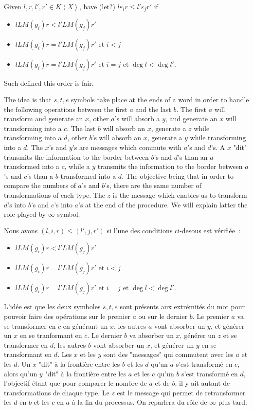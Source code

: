 \documentclass[sigconf]{acmart}
\theoremstyle{plain}
\theoremstyle{definition}
\theoremstyle{remark}
\newcommand{\LM}{LM}
\newcommand\fixmecc[1]{{\color{red}{\underline{\bf C:}} #1}}
\newcommand{\KX}{K \left\langle X \right\rangle}
\begin{document}
\fixmecc{Given $l,r,l',r'\in\KX$, have (let?) $l\varepsilon_i r\leq l'\varepsilon_j r'$ if
  \begin{itemize}
  \item $l\LM(g_i)r < l'\LM(g_j)r'$
  \item $l\LM(g_i)r = l'\LM(g_j)r'$ et $i < j$
  \item $l\LM(g_i)r = l'\LM(g_j)r'$ et $i = j$ et $\deg{l} < \deg{l'}$.
  \end{itemize}
  Such defined this order is fair.
      
  The idea is that $s, t, e$ symbols take place at the ends of a word in order to handle the following operations between the first $a$ and the last $b$.
  The first $a$ will transform and generate an $x$, other $a$'s will absorb a $y$, and generate an $x$ will transforming into a $c$.
The last $b$ will absorb an $x$, generate a $z$ while transforming into a $d$, other $b$'s will absorb an $x$, generate a $y$ while transforming into a $d$.
The $x$'s and $y$'s are messages which commute with $a$'s and $d$'s. A $x$ "dit" transmits the information to the border between $b$'s and $d$'s than an $a$ transformed into a $c$, while a $y$ transmits the information to the border between $a$'s and $c$'s than a $b$ transformed into a $d$. The objective being that in order to compare the numbers of $a$'s and $b$'s, there are the same number of transformations of each type.
The $z$ is the message which enables us to transform $d$'s into $b$'s and $c$'s into $a$'s at the end of the procedure.
We will explain latter the role played by $\infty$ symbol.
}

{  Nous avons $(l, i, r) \leq (l', j, r')$ si l'une des conditions ci-desous est vérifiée~:
\begin{itemize}
	\item $l\LM(g_i)r < l'\LM(g_j)r'$
	\item $l\LM(g_i)r = l'\LM(g_j)r'$ et $i < j$
	\item $l\LM(g_i)r = l'\LM(g_j)r'$ et $i = j$ et $\deg{l} < \deg{l'}$.
\end{itemize}

L'idée est que les deux symboles $s, t, e$ sont présents aux extrémités du mot pour pouvoir faire des opérations sur le premier $a$ ou sur le dernier $b$.
Le premier $a$ va se transformer en $c$ en générant un $x$, les autres $a$ vont absorber un $y$, et générer un $x$ en se tranformant en $c$.
Le dernier $b$ va absorber un $x$, générer un $z$ et se transformer en $d$, les autres $b$ vont absorber un $x$, et générer un $y$ en se transformant en $d$.
Les $x$ et les $y$ sont des "messages" qui commutent avec les $a$ et les $d$. Un $x$ "dit" à la frontière entre les $b$ et les $d$ qu'un $a$ s'est transformé en $c$, alors qu'un $y$ "dit" à la frontière entre les $a$ et les $c$ qu'un $b$ s'est transformé en $d$, l'objectif étant que pour comparer le nombre de $a$ et de $b$, il y ait autant de transformations de chaque type.
Le $z$ est le message qui permet de retransformer les $d$ en $b$ et les $c$ en $a$ à la fin du processus. On reparlera du rôle de $\infty$ plus tard.
}
\end{document}
